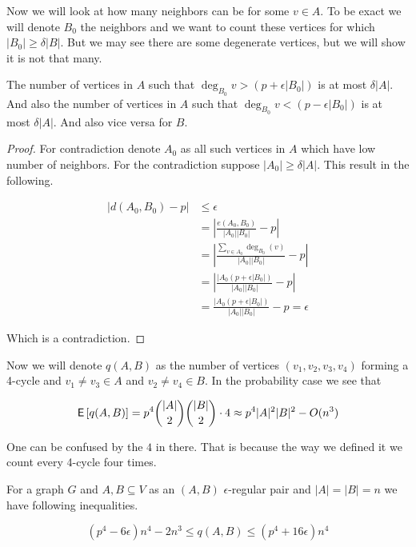 Now we will look at how many neighbors can be for some $v \in A$. To be exact we will denote $B_{0}$ the neighbors and we want to count these vertices for which $|B_{0}| \geq \delta |B|$. But we may see there are some degenerate vertices, but we will show it is not that many.

\begin{lemma}
	The number of vertices in $A$ such that $\deg_{B_{0}}v > (p + \epsilon |B_{0}|)$ is at most $\delta |A|$. And also the number of vertices in $A$ such that $\deg_{B_{0}}v < (p - \epsilon |B_{0}|)$ is at most $\delta |A|$. And also vice versa for $B$.
\end{lemma}

\begin{proof}
	For contradiction denote $A_{0}$ as all such vertices in $A$ which have low number of neighbors. For the contradiction suppose $|A_{0}| \geq \delta |A|$. This result in the following.
	
	$$
	\begin{aligned}
		|d(A_{0}, B_{0}) - p| &\leq \epsilon \\
		 &= \left| \frac{e(A_{0},B_{0})}{|A_{0}| |B_{0}|} - p \right| \\
		 &= \left| \frac{\sum_{v \in A_{0}} \deg_{B_{0}}(v)}{|A_{0}| |B_{0}|} - p \right| \\
		 &= \left| \frac{|A_{0} (p+ \epsilon |B_{0}|)}{|A_{0}| |B_{0}|} - p \right| \\
		 &= \frac{|A_{0} (p+ \epsilon |B_{0}|)}{|A_{0}| |B_{0}|} - p = \epsilon
	\end{aligned}
	$$
	
	Which is a contradiction.
\end{proof}

Now we will denote $q(A,B)$ as the number of vertices $(v_1, v_2, v_3, v_4)$ forming a 4-cycle and $v_1 \neq v_3 \in A$ and $v_2 \neq v_4 \in B$. In the probability case we see that 

$$
\operatorname{\textsf{E}\,} [q(A,B)] = p^4 \binom{|A|}{2} \binom{|B|}{2} \cdot 4 \approx p^4 |A|^2 |B|^2 - O(n^3)
$$

One can be confused by the $4$ in there. That is because the way we defined it we count every 4-cycle four times.

\begin{lemma}
	For a graph $G$ and $A, B \subseteq V$ as an $(A, B)$ $\epsilon$-regular pair and $|A| = |B| = n$ we have following inequalities.
	
	$$
	(p^4 - 6 \epsilon)n^4 - 2n^3 \leq q(A,B) \leq (p^4 + 16 \epsilon) n^4
	$$
\end{lemma}

